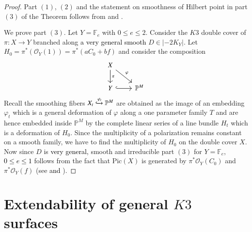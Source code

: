 \documentclass[11pt,twoside]{amsart}
\theoremstyle{plain}
\numberwithin{equation}{section}
\theoremstyle{definition}
\begin{document}
\begin{proof} Part $(1)$, $(2)$ and the statement on smoothness of Hilbert point in part $(3)$ of the Theorem follows from \cite[Theorem $3.1 (3)$, Theorem $4.3$, Theorem $5.1$]{BMR21} and \cite[Proposition $1.7$, Theorem $3.5$, Theorem $4.1$]{GP97}.
    

We prove part $(3)$. Let $Y = \mathbb{F}_e$ with $0 \leq e \leq 2$. Consider the $K3$ double cover of $\pi:X \to Y$ branched along \textcolor{black}{a very general smooth} $D \in |-2K_Y|$. Let $H_0 = \pi^*(\mathcal{O}_{Y}(1)) = \pi^*(aC_0+bf)$ and consider the composition  
\[
\begin{tikzcd}
X \arrow[dr, "\varphi"] \arrow[d, "\pi"] & \\
Y \arrow[r, hook] & \mathbb{P}^M
\end{tikzcd}
\]
Recall the smoothing fibers $X_t \xhookrightarrow{\varphi_t} \mathbb{P}^M$ are obtained as the image of an embedding $\varphi_t$ which is a general deformation of $\varphi$ along a one parameter family $T$ and are hence embedded inside $\mathbb{P}^M$ by the complete linear series of a line bundle $H_t$ which is a deformation of $H_0$. Since the multiplicity of a polarization remains constant on a smooth family, we have to find the multiplicity of $H_0$ on the double cover $X$. Now since $D$ is \textcolor{black}{very general,} smooth and irreducible part $(3)$ for $Y = \mathbb{F}_e$, \textcolor{black}{$0 \leq e \leq 1$} follows from the fact that $\textrm{Pic}(X)$ is generated by $\pi^*\mathcal{O}_Y(C_0)$ and $\pi^*\mathcal{O}_Y(f)$ (see \cite[Proposition $6.3$]{AHL10} \textcolor{black}{and \cite[Proposition $6.5$ (i), (iii)]{AHL10}}).

\end{proof}

\section{Extendability of general $K3$ surfaces}
\end{document}
